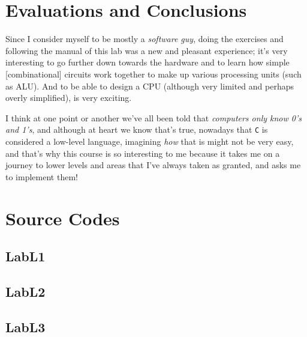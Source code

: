 \documentclass{article}
\begin{document}

\section{Evaluations and Conclusions}

Since I consider myself to be mostly a \textit{software guy}, doing the
exercises and following the manual of this lab was a new and pleasant
experience; it's very interesting to go further down towards the hardware
and to learn how simple [combinational] circuits work together to make up
various processing units (such as ALU). And to be able to design a CPU
(although very limited and perhaps overly simplified), is very exciting.\newline

I think at one point or another we've all been told that
\textit{computers only know 0's and 1's}, and although at heart we know that's
true, nowadays that \verb$C$ is considered a low-level language, imagining
\textit{how} that is might not be very easy, and that's why this course is
so interesting to me because it takes me on a journey to lower levels and areas
that I've always taken as granted, and asks me to implement them!


\section{Source Codes}


\subsection{LabL1}



\subsection{LabL2}



\subsection{LabL3}


\end{document}
